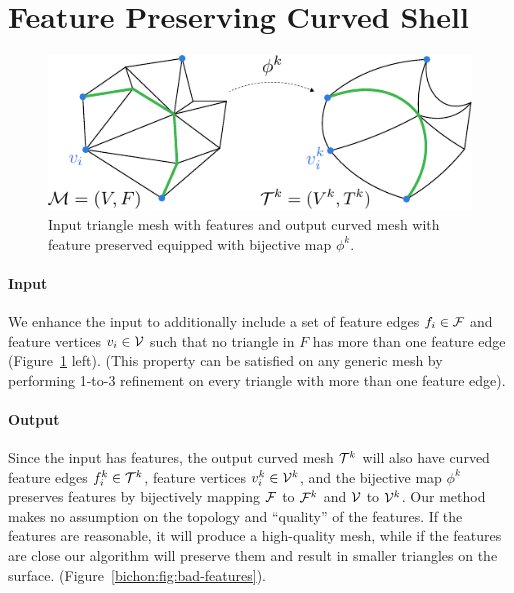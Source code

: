 \section{Feature Preserving Curved Shell}\label{sec:features-pres}


\begin{figure}
    \centering
    \includegraphics[width=.75\linewidth]{curve_meshing_in_shell_tex/figs/illustrations/input-output-feature.pdf}
    \caption{Input triangle mesh with features and output curved mesh with feature preserved equipped with bijective map $\phi^k$.}
    \label{bichon:fig:input-output-feature}
\end{figure}

\paragraph{Input}
We enhance the input to additionally include a set of feature edges $f_i\in\mathcal{F}$ and feature vertices $v_i\in\mathcal{V}$ such that no triangle in $F$ has more than one feature edge (Figure~\ref{bichon:fig:input-output-feature} left). (This property can be satisfied on any generic mesh by performing 1-to-3 refinement on every triangle with more than one feature edge). 

\paragraph{Output}
Since the input has features, the output curved mesh $\mathcal{T}^k$ will also have curved {feature} edges $f_i^k\in\mathcal{T}^k$, feature vertices $v_i^k\in\mathcal{V}^k$, and the bijective map $\phi^k$ preserves features by bijectively mapping $\mathcal{F}$ to $\mathcal{F}^k$ and $\mathcal{V}$ to $\mathcal{V}^k$. Our {method} makes no assumption on the topology and ``quality'' of the features. If the features are reasonable, it will produce {a} high-quality mesh, while if the features are close our algorithm will preserve them and result in smaller triangles on the surface. (Figure~\ref{bichon:fig:bad-features}).

